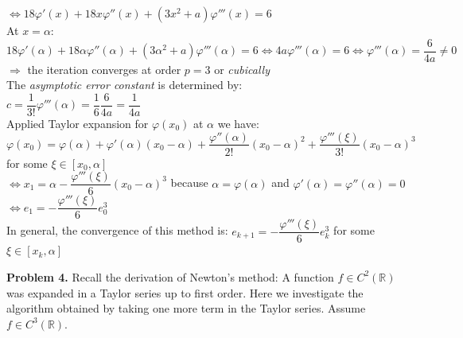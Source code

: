 \documentclass[14pt,a4paper]{article}
\begin{document}
\begin{enumerate}
	\hspace*{2cm} $\Leftrightarrow 18\varphi'(x) + 18x\varphi''(x) + (3x^2 + a)\varphi'''(x) = 6$ \\
	At $x = \alpha$: $18\varphi'(\alpha) + 18\alpha\varphi''(\alpha) + (3\alpha^2 + a)\varphi'''(\alpha) = 6 \Leftrightarrow 4a\varphi'''(\alpha) = 6 \Leftrightarrow \varphi'''(\alpha) = \dfrac{6}{4a} \neq 0 $ \\
	$\Rightarrow$ the iteration converges at order $p = 3$ or \textit{cubically}\\
	The \textit{asymptotic error constant} is determined by:\\
	\hspace*{4cm} $ c= \dfrac{1}{3!}\varphi'''(\alpha) = \dfrac{1}{6}\dfrac{6}{4a} = \dfrac{1}{4a}$\\
	Applied Taylor expansion for $\varphi(x_0)$ at $\alpha$ we have:\\
	$\varphi(x_0) = \varphi(\alpha) + \varphi'(\alpha)(x_0 -\alpha) + \dfrac{\varphi''(\alpha)}{2!}(x_0-\alpha)^2 + \dfrac{\varphi'''(\xi)}{3!}(x_0-\alpha)^3$ \hspace{0.5cm} for some $\xi \in [x_0,\alpha]$\\
	$ \Leftrightarrow x_1 = \alpha - \dfrac{\varphi'''(\xi)}{6}(x_0-\alpha)^3$ \hspace{2cm} because $\alpha = \varphi(\alpha)$ and $\varphi'(\alpha) = \varphi''(\alpha) = 0$\\
	\hspace*{0.5cm}	$ \Leftrightarrow e_1 = - \dfrac{\varphi'''(\xi)}{6}e_0^3$\\
	In general, the convergence of this method is: $e_{k+1} = - \dfrac{\varphi'''(\xi)}{6}e_k^3$ \hspace{0.5cm} for some $\xi \in [x_k,\alpha]$\\
	
\end{enumerate}

\label{Problem 4}
\large\textbf{Problem 4.} Recall the derivation of Newton's method: A function $f \in C^2(\mathbb{R})$ was expanded in a Taylor series up to first order. Here we investigate the algorithm obtained by taking one more term in the Taylor series. Assume $f \in C^3(\mathbb{R})$.
\end{document}
